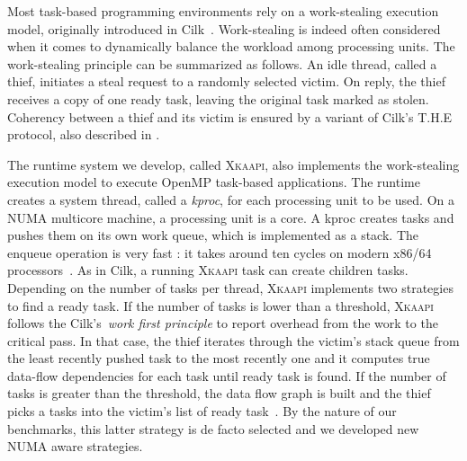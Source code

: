 \documentclass{Styles/llncs}
\newcommand{\kaapi}{\textsc{\mbox{Xkaapi}}\xspace}
\begin{document}
Most task-based programming environments rely on a work-stealing execution model, originally introduced in Cilk~\cite{cilk5}. 
Work-stealing is indeed often considered when it comes to dynamically balance the workload among processing units. 
The work-stealing principle can be summarized as follows. 
An idle thread, called a thief, initiates a steal request to a randomly selected victim. 
On reply, the thief receives a copy of one ready task, leaving the original task marked as stolen.
Coherency between a thief and its victim is ensured by a variant of Cilk's T.H.E protocol, also described in \cite{cilk5}.

The runtime system we develop, called \kaapi, also implements the work-stealing execution model to execute OpenMP task-based applications.
The runtime creates a system thread, called a \emph{kproc}, for each processing unit to be used.
On a NUMA multicore machine, a processing unit is a core.
A kproc creates tasks and pushes them on its own work queue, which is implemented as a stack.
The enqueue operation is very fast : it takes around ten cycles on modern x86/64 processors~\cite{libkomp}.
As in Cilk, a  running \kaapi task can create children tasks. 
Depending on the number of tasks per thread, \kaapi implements two strategies to find a ready task.
If the number of tasks is lower than a threshold, \kaapi follows the Cilk's~\textit{work first principle} to report overhead
from the work to the critical pass. In that case, the thief iterates through the victim's stack queue from 
the least recently pushed task to the most recently one and it computes true
data-flow dependencies for each task until ready task is found. If the number of tasks is greater than the threshold, 
the data flow graph is built and the thief picks a tasks into the victim's list of ready task~\cite{Bleuse2014}.
By the nature of our benchmarks, this latter strategy is de facto selected and we developed new NUMA aware strategies.


%
\end{document}
